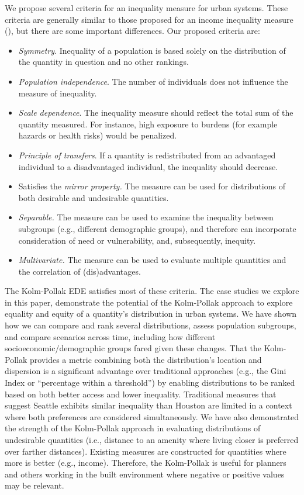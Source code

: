 \documentclass[final,3p,times,onecolumn,sort&compress]{elsarticle}
\begin{document}
We propose several criteria for an inequality measure for urban systems.
These criteria are generally similar to those proposed for an income inequality measure (\cite{Adger1997-tu, Blackwood1994-ie, Fields1978-tb}), but there are some important differences. 
Our proposed criteria are:
\begin{itemize}
    \item \textit{Symmetry}. Inequality of a population is based solely on the distribution of the quantity in question and no other rankings.
    \item \textit{Population independence}. The number of individuals does not influence the measure of inequality.
    \item \textit{Scale dependence}. The inequality measure should reflect the total sum of the quantity measured. For instance, high exposure to burdens (for example hazards or health risks) would be penalized.
    \item \textit{Principle of transfers}. If a quantity is redistributed from an advantaged individual to a disadvantaged individual, the inequality should decrease.
    \item Satisfies the \textit{mirror property.} The measure can be used for distributions of both desirable and undesirable quantities. 
    \item \textit{Separable.} The measure can be used to examine the inequality between subgroups (e.g., different demographic groups), and therefore can incorporate consideration of need or vulnerability, and, subsequently, inequity.
    \item \textit{Multivariate.} The measure can be used to evaluate multiple quantities and the correlation of (dis)advantages. 
\end{itemize}

The Kolm-Pollak EDE satisfies most of these criteria.
The case studies we explore in this paper, demonstrate the potential of the Kolm-Pollak approach to explore equality and equity of a quantity's distribution in urban systems.
We have shown how we can compare and rank several distributions, assess population subgroups, and compare scenarios across time, including how different socioeconomic/demographic groups fared given these changes.
That the Kolm-Pollak provides a metric combining both the distribution's location and dispersion is a significant advantage over traditional approaches (e.g., the Gini Index or ``percentage within a threshold'') by enabling distributions to be ranked based on both better access and lower inequality.
Traditional measures that suggest Seattle exhibits similar inequality than Houston are limited in a context where both preferences are considered simultaneously. 
We have also demonstrated the strength of the Kolm-Pollak approach in evaluating distributions of undesirable quantities (i.e., distance to an amenity where living closer is preferred over farther distances).
Existing measures are constructed for quantities where more is better (e.g., income).
Therefore, the Kolm-Pollak is useful for planners and others working in the built environment where negative or positive values may be relevant.
\end{document}
